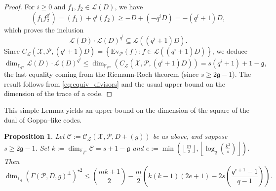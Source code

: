 \documentclass[a4paper]{article}
\newtheorem{proposition}[thm]{Proposition}
\theoremstyle{definition}
\theoremstyle{remark}
\newcommand{\calP}{\mathcal{P}}
\newcommand{\calL}{\mathcal{L}}
\newcommand{\calC}{\mathcal{C}}
\newcommand{\calX}{\mathcal{X}}
\newcommand{\fqm}{\mathbb{F}_{q^m}}
\newcommand{\fq}{\mathbb{F}_{q}}
\newcommand{\set}[1]{\left\{#1\right\}}
\begin{document}
\begin{proof}
For $i \geq 0$ and $f_1,f_2 \in \calL(D)$, we have 
$$(f_1f_2^{q^i}) = (f_1)+q^i(f_2) \geq -D +(-q^iD) = -(q^i+1)D,$$
which proves the inclusion
$$ \calL(D)\cdot \calL(D)^{q^i} \subseteq \calL((q^i+1)D).$$
Since $C_{\calL}(\calX,\calP,(q^i+1)D) = \set{\mathrm{Ev}_{\calP}(f) : f \in \calL((q^i+1)D)}$, we deduce 
$$ \dim_{\fqm} \calL(D) \cdot \calL(D)^{q^i} \leq \dim_{\fqm}\left(C_{\calL}(\calX,\calP,(q^i+1)D)\right) = s(q^i+1)+1-\mathfrak{g},$$
the last equality coming from the Riemann-Roch theorem (since $s \geq 2\mathfrak{g}-1$). The result follows from \eqref{eq:equiv_divisors} and the usual upper bound on the dimension of the trace of a code. 
\end{proof}

\noindent This simple Lemma yields an upper bound on the dimension of the square of the dual of Goppa--like codes.

\begin{proposition} \label{prop:bound_dim_using_inclusions}
    Let $\calC := \calC_{\calL}(\calX,\calP,D+(g))$ be as above, and suppose $s \geq 2\mathfrak{g}-1$. Set $k := \dim_{\fqm}\calC = s+1-\mathfrak{g}$ and  $e := \min\left(\left\lfloor \frac{m}{2} \right\rfloor,\left\lfloor \log_q\left(\frac{k^2}{s}\right)\right\rfloor\right)$. Then
    $$\dim_{\fq} (\Gamma(\calP,D,g)^{\perp})^{\star 2} \leq \binom{mk+1}{2} - \dfrac{m}{2}\left(k(k-1)(2e+1)-2s\left(\dfrac{q^{e+1}-1}{q-1}\right)\right).$$
\end{proposition}
\end{document}

